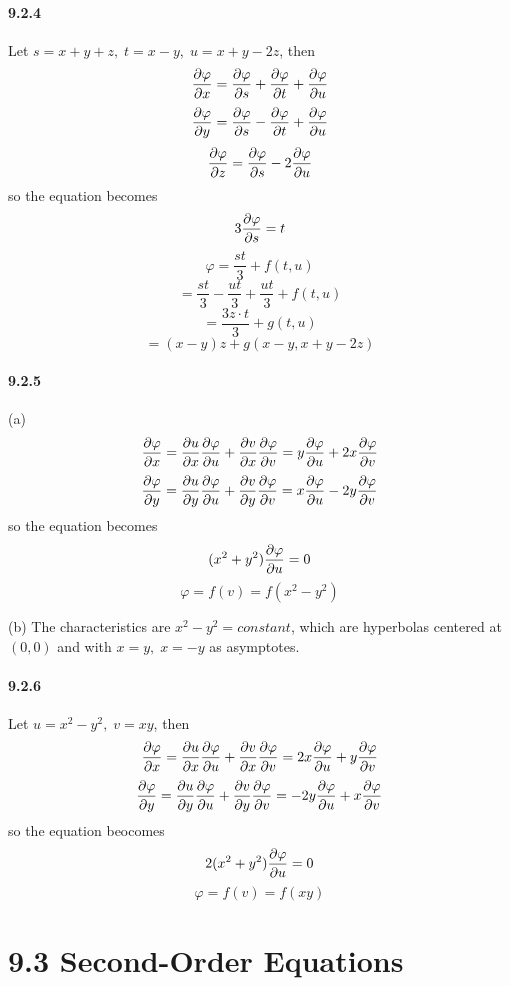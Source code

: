 \documentclass[a4paper]{article}
\begin{document}
\paragraph{9.2.4}
Let $s=x+y+z,\;t=x-y,\;u=x+y-2z$, then
\[
\pdv{\varphi}{x}=\pdv{\varphi}{s}+\pdv{\varphi}{t}+\pdv{\varphi}{u}
\]
\[
\pdv{\varphi}{y}=\pdv{\varphi}{s}-\pdv{\varphi}{t}+\pdv{\varphi}{u}
\]
\[
\pdv{\varphi}{z}=\pdv{\varphi}{s}-2\pdv{\varphi}{u}
\]
so the equation becomes
\[
3\pdv{\varphi}{s}=t
\]
\[
\varphi=\frac{st}{3}+f(t,u)
\]
\[
=\frac{st}{3}-\frac{ut}{3}+\frac{ut}{3}+f(t,u)
\]
\[
=\frac{3z\cdot t}{3}+g(t,u)
\]
\[
=(x-y)z+g(x-y,x+y-2z)
\]

\paragraph{9.2.5}
(a)
\[
\pdv{\varphi}{x}=\pdv{u}{x}\pdv{\varphi}{u}+\pdv{v}{x}\pdv{\varphi}{v}=y\pdv{\varphi}{u}+2x\pdv{\varphi}{v}
\]
\[
\pdv{\varphi}{y}=\pdv{u}{y}\pdv{\varphi}{u}+\pdv{v}{y}\pdv{\varphi}{v}=x\pdv{\varphi}{u}-2y\pdv{\varphi}{v}
\]
so the equation becomes
\[
(x^2+y^2)\pdv{\varphi}{u}=0
\]
\[
\varphi=f(v)=f(x^2-y^2)
\]

(b)
The characteristics are $x^2-y^2=constant$, which are hyperbolas centered at $(0,0)$ and with $x=y,\;x=-y$ as asymptotes. 

\paragraph{9.2.6}
Let $u=x^2-y^2,\;v=xy$, then
\[
\pdv{\varphi}{x}=\pdv{u}{x}\pdv{\varphi}{u}+\pdv{v}{x}\pdv{\varphi}{v}=2x\pdv{\varphi}{u}+y\pdv{\varphi}{v}
\]
\[
\pdv{\varphi}{y}=\pdv{u}{y}\pdv{\varphi}{u}+\pdv{v}{y}\pdv{\varphi}{v}=-2y\pdv{\varphi}{u}+x\pdv{\varphi}{v}
\]
so the equation beocomes
\[
2(x^2+y^2)\pdv{\varphi}{u}=0
\]
\[
\varphi=f(v)=f(xy)
\]

\section*{9.3 Second-Order Equations}
\end{document}
